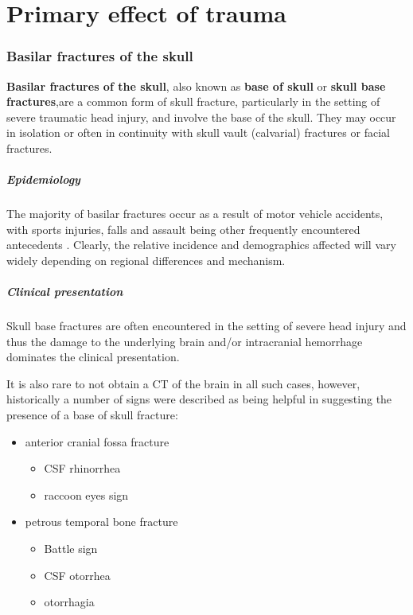 \chapter{Primary effect of trauma}

\subsection{Basilar fractures of the skull}

\textbf{Basilar fractures of the skull}, also known as \textbf{base of skull} or \textbf{skull base fractures},are a common form of skull fracture, particularly in the setting of severe traumatic head injury, and involve the base of the skull. They may occur in isolation or often in continuity with skull vault (calvarial) fractures or facial fractures.

\paragraph{Epidemiology}

The majority of basilar fractures occur as a result of motor vehicle accidents, with sports injuries, falls and assault being other frequently encountered antecedents . Clearly, the relative incidence and demographics affected will vary widely depending on regional differences and mechanism.

\paragraph{Clinical presentation}

Skull base fractures are often encountered in the setting of severe head injury and thus the damage to the underlying brain and/or intracranial hemorrhage dominates the clinical presentation.

It is also rare to not obtain a CT of the brain in all such cases, however, historically a number of signs were described as being helpful in suggesting the presence of a base of skull fracture:

\begin{itemize}
	\item
	anterior cranial fossa fracture
	
	\begin{itemize}
		\item
		CSF rhinorrhea
		\item
		raccoon eyes sign
	\end{itemize}
	\item
	petrous temporal bone fracture
	
	\begin{itemize}
		\item
		Battle sign
		\item
		CSF otorrhea
		\item
		otorrhagia
	\end{itemize}
\end{itemize}


